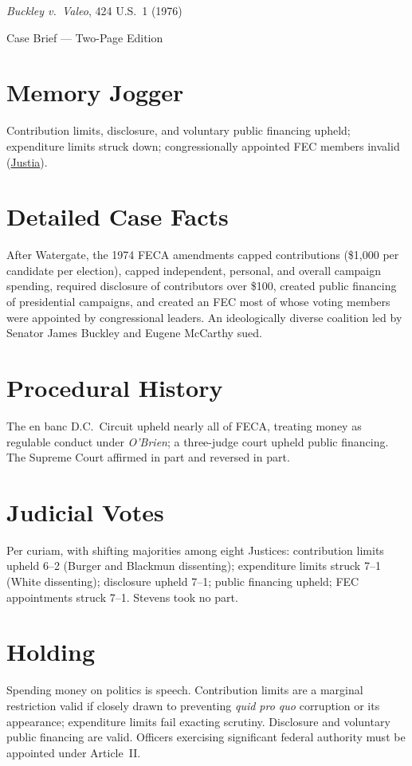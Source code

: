 \documentclass[12pt]{article}
\begin{document}
\begin{center}
{\LARGE \textit{Buckley v.\ Valeo}, 424 U.S.\ 1 (1976)\par}
\vspace{0.5em}
{\large Case Brief --- Two-Page Edition\par}
\end{center}

\section{Memory Jogger}
Contribution limits, disclosure, and voluntary public financing upheld; expenditure limits struck down; congressionally appointed FEC members invalid (\href{https://supreme.justia.com/cases/federal/us/424/1/}{Justia}).

\section{Detailed Case Facts}
After Watergate, the 1974 FECA amendments capped contributions (\$1,000 per candidate per election), capped independent, personal, and overall campaign spending, required disclosure of contributors over \$100, created public financing of presidential campaigns, and created an FEC most of whose voting members were appointed by congressional leaders. An ideologically diverse coalition led by Senator James Buckley and Eugene McCarthy sued.

\section{Procedural History}
The en banc D.C.\ Circuit upheld nearly all of FECA, treating money as regulable conduct under \textit{O'Brien}; a three-judge court upheld public financing. The Supreme Court affirmed in part and reversed in part.

\section{Judicial Votes}
Per curiam, with shifting majorities among eight Justices: contribution limits upheld 6--2 (Burger and Blackmun dissenting); expenditure limits struck 7--1 (White dissenting); disclosure upheld 7--1; public financing upheld; FEC appointments struck 7--1. Stevens took no part.

\section{Holding}
Spending money on politics is speech. Contribution limits are a marginal restriction valid if closely drawn to preventing \textit{quid pro quo} corruption or its appearance; expenditure limits fail exacting scrutiny. Disclosure and voluntary public financing are valid. Officers exercising significant federal authority must be appointed under Article~II.
\end{document}
